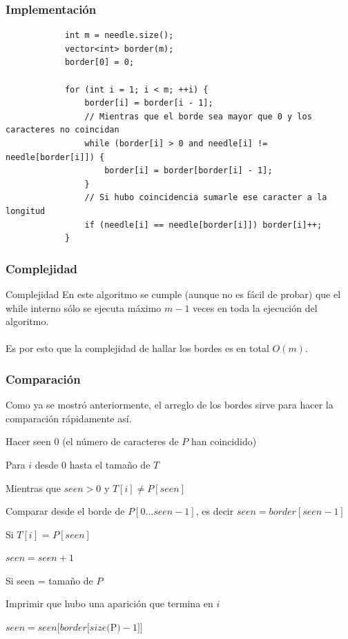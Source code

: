 \documentclass{beamer}
\begin{document}
	\begin{frame}[fragile]
		\frametitle{Implementación}
		\begin{lstlisting}
			int m = needle.size();
			vector<int> border(m);
			border[0] = 0;
			 
			for (int i = 1; i < m; ++i) {
			    border[i] = border[i - 1];
			    // Mientras que el borde sea mayor que 0 y los caracteres no coincidan
			    while (border[i] > 0 and needle[i] != needle[border[i]]) {
			        border[i] = border[border[i] - 1];
			    }
			    // Si hubo coincidencia sumarle ese caracter a la longitud
			    if (needle[i] == needle[border[i]]) border[i]++;
			}
		\end{lstlisting}
	\end{frame}
	
	\begin{frame}
		\frametitle{Complejidad}
		\begin{block}{Complejidad}
			En este algoritmo se cumple (aunque no es fácil de probar) que el while interno sólo se ejecuta máximo $m-1$ veces en toda la ejecución del algoritmo.\\ \quad \\
			Es por esto que la complejidad de hallar los bordes es en total $O(m)$.
		\end{block}
	\end{frame}
	
	\begin{frame}
		\frametitle{Comparación}
		Como ya se mostró anteriormente, el arreglo de los bordes sirve para hacer la comparación rápidamente así.\\
		\begin{enumerate}
			\item Hacer seen 0 (el número de caracteres de $P$ han coincidido)
			\item Para $i$ desde 0 hasta el tamaño de $T$
			{\setlength\itemindent{15pt} \item Mientras que $seen > 0$ y $T[i] \neq P[seen]$} 
			{\setlength\itemindent{30pt} \item Comparar desde el borde de $P[0 \ldots seen-1]$, es decir $seen = border[seen-1]$}
			{\setlength\itemindent{15pt} \item Si $T[i]$ = $P[seen]$}
			{\setlength\itemindent{30pt} \item $seen = seen + 1$}
			{\setlength\itemindent{15pt} \item Si seen = tamaño de $P$}
			{\setlength\itemindent{30pt} \item Imprimir que hubo una aparición que termina en $i$}
			{\setlength\itemindent{30pt} \item $seen = seen[border[size($P$) - 1]]$}
		\end{enumerate}
	\end{frame}
	
\end{document}
